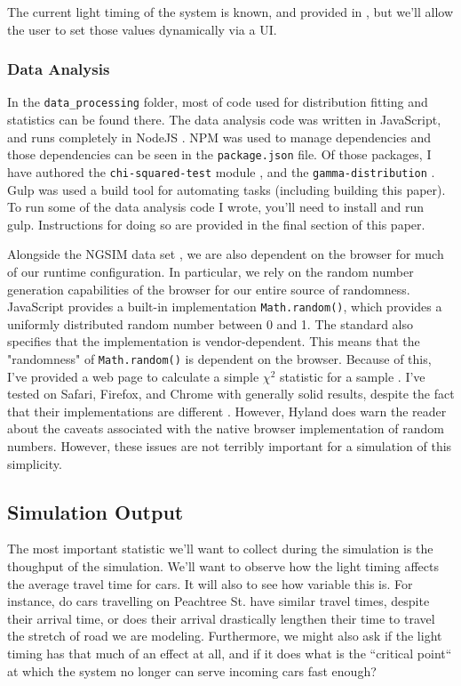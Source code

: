 \documentclass[a4paper,12pt]{article}
\begin{document}
The current light timing of the system is known, and provided in \cite{ngsim}, but we'll allow the user to set
those values dynamically via a UI.

\subsubsection{Data Analysis}
In the \texttt{data\_processing} folder, most of code used for distribution fitting and statistics can be found there.
The data analysis code was written in JavaScript, and runs completely in NodeJS \cite{nodejs}. NPM \cite{npm} was used
to manage dependencies and those dependencies can be seen in the \texttt{package.json} file. Of those packages, I have
authored the \texttt{chi-squared-test} module \cite{chiSquaredNpm}, and the \texttt{gamma-distribution}
\cite{gammaDistributionNpm}. Gulp \cite{gulp} was used a build tool for automating tasks (including building this paper).
To run some of the data analysis code I wrote, you'll need to install and run gulp. Instructions for doing so are
provided in the final section of this paper.

Alongside the NGSIM data set \cite{ngsim}, we are also dependent on the browser for much of our runtime configuration.
In particular, we rely on the random number generation capabilities of the browser for our entire source of randomness.
JavaScript provides a built-in implementation \cite{ecmascriptmath} \texttt{Math.random()}, which provides a uniformly
distributed random number between 0 and 1. The standard also specifies that the implementation is vendor-dependent.
This means that the "randomness" of \texttt{Math.random()} is dependent on the browser. Because of this, I've provided
a web page to calculate a simple $\chi^2$ statistic for a sample \cite{rngtester}. I've tested on Safari, Firefox, and
Chrome with generally solid results, despite the fact that their implementations are different
\cite{rngimplementation}. However, Hyland \cite{rngimplementation} does warn the reader about the caveats associated
with the native browser implementation of random numbers. However, these issues are not terribly important for a
simulation of this simplicity.

\subsection{Simulation Output}
The most important statistic we'll want to collect during the simulation is the thoughput of the simulation. We'll
want to observe how the light timing affects the average travel time for cars. It will also to see how variable this
is. For instance, do cars travelling on Peachtree St. have similar travel times, despite their arrival time, or does
their arrival drastically lengthen their time to travel the stretch of road we are modeling. Furthermore, we might also
ask if the light timing has that much of an effect at all, and if it does what is the ``critical point`` at which the
system no longer can serve incoming cars fast enough?
\end{document}
